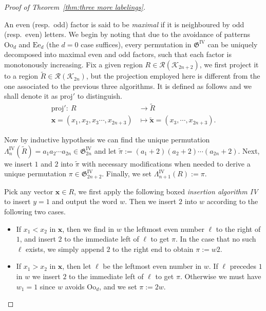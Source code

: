 \documentclass[11pt,reqno]{amsart}
\numberwithin{equation}{section}
\theoremstyle{plain}
\theoremstyle{definition}
\newcommand{\bx}{\mathbf{x}}
\newcommand{\fG}{\mathfrak{G}}
\newcommand{\cK}{\mathcal{K}}
\newcommand{\cR}{\mathcal{R}}
\newcommand{\GIV}{\fG^{\mathrm{IV}}}
\newcommand{\LIV}{\Lambda^{\mathrm{IV}}}
\newcommand{\proj}{\mathrm{proj}}
\def\Oo{\mathrm{Oo}}
\def\Ee{\mathrm{Ee}}
\begin{document}
\begin{proof}[Proof of Theorem~\ref{thm:three more labelings}]
\begin{figure}[h!]
    \end{figure}
    
    An even (resp.~odd) factor is said to be \emph{maximal} if it is neighboured by odd (resp.~even) letters. We begin by noting that due to the avoidance of patterns $\Oo_d$ and $\Ee_d$ (the $d=0$ case suffices), every permutation in $\GIV$ can be uniquely decomposed into maximal even and odd factors, such that each factor is monotonously increasing. Fix a given region $R\in\cR(\cK_{2n+2})$, we first project it to a region $\tilde{R}\in\cR(\cK_{2n})$, but the projection employed here is different from the one associated to the previous three algorithms. It is defined as follows and we shall denote it as $\proj'$ to distinguish.
    \begin{align*}
    	\proj':~R &\to \tilde{R} \\
    	\bx=(x_1,x_2,x_3\cdots,x_{2n+3}) &\mapsto \tilde{\bx}=(x_3,\cdots,x_{2n+3}).
    \end{align*}
    
    Now by inductive hypothesis we can find the unique permutation $\LIV_{n}(\tilde{R})=a_1a_2\cdots a_{2n}\in\GIV_{2n}$ and let $\tilde{\pi}:=(a_1+2)(a_2+2)\cdots (a_{2n}+2)$. Next, we insert $1$ and $2$ into $\tilde{\pi}$ with necessary modifications when needed to derive a unique permutation $\pi\in\GIV_{2n+2}$. Finally, we set $\LIV_{n+1}(R):=\pi$. 
    
    Pick any vector $\bx\in R$, we first apply the following boxed {\it insertion algorithm IV} to insert $y=1$ and output the word $w$. Then we insert $2$ into $w$ according to the following two cases.
    \begin{itemize}
    	\item If $x_1<x_2$ in $\bx$, then we find in $w$ the leftmost even number $\ell$ to the right of $1$, and insert $2$ to the immediate left of $\ell$ to get $\pi$. In the case that no such $\ell$ exists, we simply append $2$ to the right end to obtain $\pi:=w2$. 
    	\item If $x_1>x_2$ in $\bx$, then let $\ell$ be the leftmost even number in $w$. If $\ell$ precedes $1$ in $w$ we insert $2$ to the immediate left of $\ell$ to get $\pi$. Otherwise we must have $w_1=1$ since $w$ avoids $\Oo_d$, and we set $\pi:=2w$.
    \end{itemize}
    

\end{proof}
\end{document}
